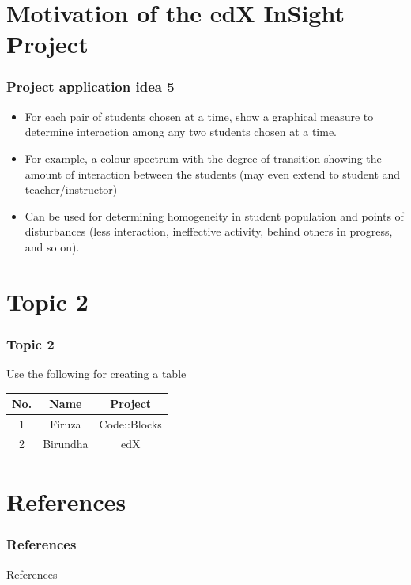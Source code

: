 \documentclass[12pt,xcolor=dvipsnames]{beamer}
\begin{document}
\section{Motivation of the edX InSight Project}
\begin{frame}[t]
\frametitle{Project application idea 5}

\begin{itemize}
\item For each pair of students chosen at a time, show a graphical measure to determine interaction among any two students chosen at a time.
\item For example, a colour spectrum with the degree of transition showing the amount of interaction between the students (may even extend to student and teacher/instructor)
\item Can be used for determining homogeneity in student population and points of disturbances (less interaction, ineffective activity, behind others in progress, and so on).

\end{itemize}
\end{frame}


\section{Topic 2}
\begin{frame}[t]
\frametitle{Topic 2}
Use the following for creating a table \\
\begin{center}
\begin{tabular}{|c|c|c|}
 \hline
 No. & Name & Project \\
 \hline
 1 & Firuza & Code::Blocks \\
 \hline
 2 & Birundha & edX \\
 \hline
\end{tabular}
\end{center}
\end{frame}


\section{References}
\frametitle{References}
\begin{frame}[allowframebreaks]{References}


\end{frame}
\end{document}

